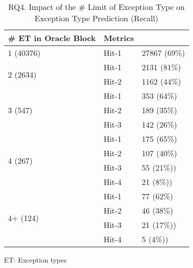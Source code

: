 \begin{table}[t]
	\caption{RQ4. Impact of the \# Limit of Exception Type on Exception Type Prediction (Recall)}
	\tabcolsep 2pt
	{\small
		\begin{center}
			\renewcommand{\arraystretch}{1}
			\begin{tabular}{p{3.5cm}<{\centering}|p{2cm}<{\centering}|p{2.5cm}<{\centering}}
				\hline
				\# ET in Oracle Block& Metrics& {\textsc{\tool}\xspace} \\
				\hline
				\multirow{1}{*}{1 (40376)}   & Hit-1  & 27867 (69\%) \\
				\hline
				\multirow{2}{*}{2 (2634)}  & Hit-1   & 2131 (81\%) \\
				& Hit-2         &  1162 (44\%) \\
				\hline
				\multirow{3}{*}{3 (547)}  & Hit-1    & 353 (64\%) \\
				& Hit-2     & 189 (35\%)\\
				& Hit-3     & 142 (26\%) \\
				\hline
				\multirow{4}{*}{4 (267)}  & Hit-1   & 175 (65\%) \\
				& Hit-2     & 107 (40\%) \\
				& Hit-3     & 55 (21\%))\\
				& Hit-4     & 21 (8\%))\\
				\hline
				\multirow{4}{*}{4+ (124)}  & Hit-1   & 77 (62\%) \\
				& Hit-2     & 46 (38\%) \\
				& Hit-3     & 21 (17\%))\\
				& Hit-4     & 5 (4\%))\\
				\hline
			\end{tabular}		
			ET: Exception types
			\label{RQ4_results_4}
		\end{center}
	}
\end{table}

